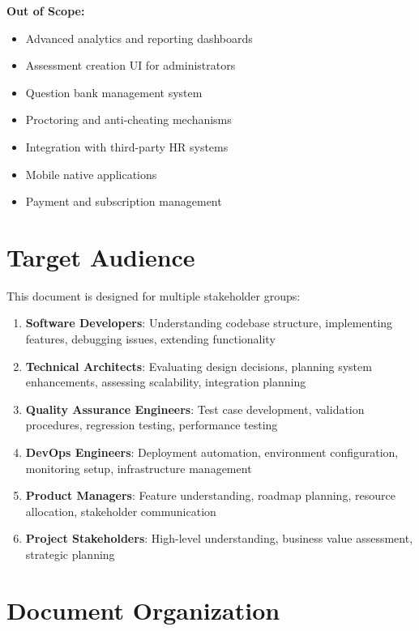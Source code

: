 \documentclass[12pt,a4paper]{report}
\begin{document}
\textbf{Out of Scope:}
\begin{itemize}
    \item Advanced analytics and reporting dashboards
    \item Assessment creation UI for administrators
    \item Question bank management system
    \item Proctoring and anti-cheating mechanisms
    \item Integration with third-party HR systems
    \item Mobile native applications
    \item Payment and subscription management
\end{itemize}

\section{Target Audience}

This document is designed for multiple stakeholder groups:

\begin{enumerate}
    \item \textbf{Software Developers}: Understanding codebase structure, implementing features, debugging issues, extending functionality
    
    \item \textbf{Technical Architects}: Evaluating design decisions, planning system enhancements, assessing scalability, integration planning
    
    \item \textbf{Quality Assurance Engineers}: Test case development, validation procedures, regression testing, performance testing
    
    \item \textbf{DevOps Engineers}: Deployment automation, environment configuration, monitoring setup, infrastructure management
    
    \item \textbf{Product Managers}: Feature understanding, roadmap planning, resource allocation, stakeholder communication
    
    \item \textbf{Project Stakeholders}: High-level understanding, business value assessment, strategic planning
\end{enumerate}

\section{Document Organization}
\end{document}
